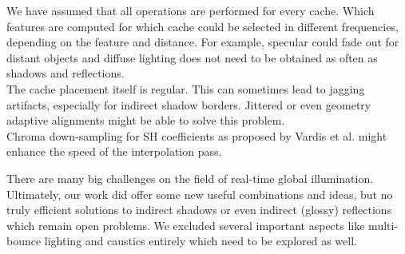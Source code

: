 \documentclass[thesis.tex]{subfiles}
\begin{document}
We have assumed that all operations are performed for every cache.
Which features are computed for which cache could be selected in different frequencies, depending on the feature and distance.
For example, specular could fade out for distant objects and diffuse lighting does not need to be obtained as often as shadows and reflections.
\\
The cache placement itself is regular.
This can sometimes lead to jagging artifacts, especially for indirect shadow borders.
Jittered or even geometry adaptive alignments might be able to solve this problem.
\\
Chroma down-sampling for SH coefficients as proposed by Vardis et al. \cite{bib:radiancecachechromaticcompression} might enhance the speed of the interpolation pass.

There are many big challenges on the field of real-time global illumination.
Ultimately, our work did offer some new useful combinations and ideas, but no truly efficient solutions to indirect shadows or even indirect (glossy) reflections which remain open problems.
We excluded several important aspects like multi-bounce lighting and caustics entirely which need to be explored as well.


\subfilebib %
\end{document}
